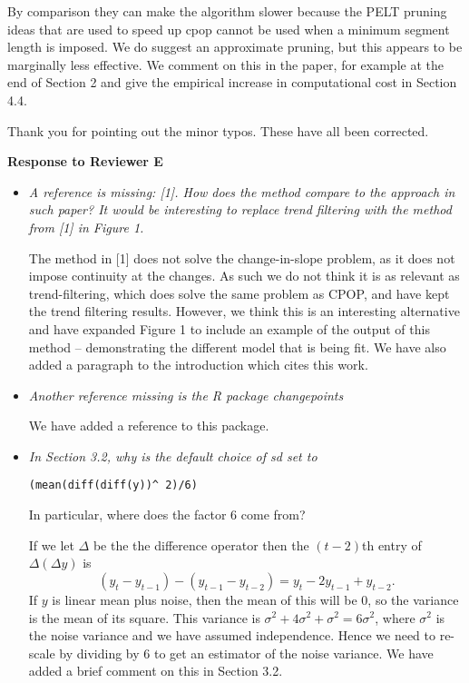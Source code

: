 \documentclass[12pt]{article}
\begin{document}
\begin{itemize}
By comparison they can make the algorithm slower because the PELT pruning ideas that are used to speed up cpop cannot be used when a minimum segment length is imposed. We do suggest an approximate pruning, but this appears to be marginally less effective. We comment on this in the paper, for example at the end of Section 2 and give the empirical increase in computational cost in Section 4.4.

\end{itemize}

Thank you for pointing out the minor typos. These have all been corrected.

\vspace*{1em}

\noindent
{\bf Response to Reviewer E}
\begin{itemize}
\item {\em   A reference is missing: [1]. How does the method compare to the approach in such paper? It would be interesting to replace trend filtering with the method from [1] in Figure 1.}

The method in [1] does not solve the change-in-slope problem, as it does not impose continuity at the changes. As such we do not think it is as relevant as trend-filtering, which does solve the same problem as CPOP, and have kept the trend filtering results. However, we think this is an interesting alternative and have expanded Figure 1 to include an example of the output of this method -- demonstrating the different model that is being fit. We have also added a paragraph to the introduction which cites this work.

\item {\em   Another reference missing is the R package changepoints}

We have added a reference to this package. 

\item {\em   In Section 3.2, why is the default choice of sd set to 
\begin{verbatim}
(mean(diff(diff(y))^ 2)/6)
\end{verbatim}
In particular, where does the factor 6 come from?}

If we let $\Delta$ be the the difference operator then the $(t-2)$th entry of $\Delta(\Delta y)$ is
\[
(y_t-y_{t-1})-(y_{t-1}-y_{t-2})=y_t-2y_{t-1}+y_{t-2}.
\]
If $y$ is linear mean plus noise, then the mean of this will be 0, so the variance is the mean of its square. This variance is $\sigma^2+4\sigma^2+\sigma^2=6\sigma^2$, where $\sigma^2$ is the noise variance and we have assumed independence. Hence we need to re-scale by dividing by 6 to get an estimator of the noise variance. We have added a brief comment on this in Section 3.2.


\end{itemize}
\end{document}
